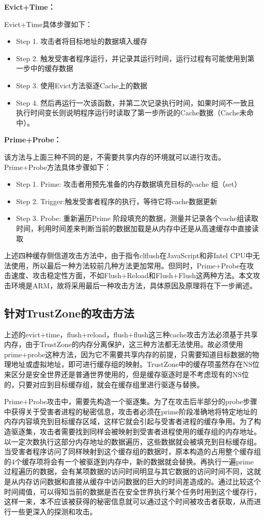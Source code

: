 \textbf{Evict+Time：}

Evict+Time具体步骤如下：

\begin{itemize}
	\item Step 1. 攻击者将目标地址的数据填入缓存
	\item Step 2. 触发受害者程序运行，并记录其运行时间，运行过程有可能使用到第一步中的缓存数据
	\item Step 3. 使用Evict方法驱逐Cache上的数据
	\item Step 4. 然后再运行一次该函数，并第二次记录执行时间，如果时间不一致且执行时间变长则说明程序运行时读取了第一步所说的Cache数据（Cache未命中）。
\end{itemize}

\textbf{Prime+Probe：}

该方法与上面三种不同的是，不需要共享内存的环境就可以进行攻击。Prime+Probe方法具体步骤如下：

\begin{itemize}
	\item Step 1. Prime: 攻击者用预先准备的内存数据填充目标的cache 组（set）
	\item Step 2. Trigger:触发受害者程序的执行，等待它将cache数据更新
	\item Step 3. Probe: 重新遍历Prime 阶段填充的数据，测量并记录各个cache组读取时间，利用时间差来判断当前的数据加载是从内存中还是从高速缓存中直接读取
\end{itemize}

上述四种缓存侧信道攻击方法中，由于指令clflush在JavaScript和非Intel CPU中无法使用，所以最后一种方法较前几种方法更加常用。但同时，Prime+Probe在攻击速度、攻击稳定性方面，不如Flush+Reload和Flush+Flush这两种方法。本文攻击环境是ARM，故将采用最后一种攻击方法，具体原因及原理将在下一步阐述。

\subsection{针对TrustZone的攻击方法}
上述的evict+time，flush+reload，flush+flush这三种cache攻击方法必须基于共享内存，由于TrustZone的内存分离保护，这三种方法都无法使用。故必须使用prime+probe这种方法，因为它不需要共享内存的前提，只需要知道目标数据的物理地址或虚拟地址，即可进行缓存组的映射。TrustZone中的缓存项虽然存在NS位来区分是安全世界还是普通世界使用的，但是缓存驱逐时是不考虑现有的NS位的，只要对应到目标缓存组，就会在缓存组里进行驱逐与替换。

Prime+Probe攻击中，需要先构造一个驱逐集。为了在攻击后半部分的probe步骤中获得关于受害者进程的秘密信息，攻击者必须在prime阶段准确地将特定地址的内存内容填充到目标缓存区域，这样它就会引起与受害者进程的缓存争用。为了构造驱逐集，攻击者需要找到同样会被映射到受害者进程使用的缓存组的内存地址。以一定次数执行这部分内存地址的数据遍历，这些数据就会被填充到目标缓存组。当受害者程序访问了同样映射到这个缓存组的数据时，原本构造的占用整个缓存组的4个缓存项将会有一个被驱逐到内存中，新的数据就会替换。再执行一遍prime过程遍历的数据，会有某项数据的访问时间明显与其它数据的访问时间不同，这就是从内存访问数据和直接从缓存中访问数据的巨大的时间差造成的。通过比较这个时间阈值，可以得知当前的数据是否在安全世界执行某个任务时用到这个缓存行，这样一来，本不应该被获得的秘密信息就可以通过这个时间被攻击者获取，从而进行一些更深入的探测和攻击。



